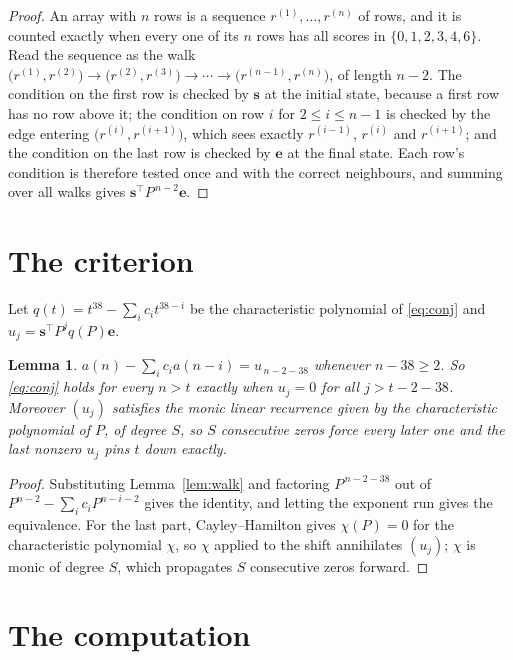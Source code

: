 \documentclass[11pt,a4paper]{article}
\theoremstyle{plain}
\newtheorem{lemma}[theorem]{Lemma}
\theoremstyle{definition}
\begin{document}
\begin{proof}
An array with $n$ rows is a sequence $r^{(1)},\dots,r^{(n)}$ of rows, and it is counted
exactly when every one of its $n$ rows has all scores in $\{0,1,2,3,4,6\}$. Read the sequence as the
walk $\bigl(r^{(1)},r^{(2)}\bigr)\to\bigl(r^{(2)},r^{(3)}\bigr)\to\cdots\to
\bigl(r^{(n-1)},r^{(n)}\bigr)$, of length $n-2$. The condition on the first row is
checked by $\mathbf{s}$ at the initial state, because a first row has no row above it; the
condition on row $i$ for $2\le i\le n-1$ is checked by the edge entering
$\bigl(r^{(i)},r^{(i+1)}\bigr)$, which sees exactly $r^{(i-1)}$, $r^{(i)}$ and
$r^{(i+1)}$; and the condition on the last row is checked by $\mathbf{e}$ at the final
state. Each row's condition is therefore tested once and with the correct neighbours, and
summing over all walks gives $\mathbf{s}^{\!\top}P^{\,n-2}\mathbf{e}$.
\end{proof}

\section{The criterion}

Let $q(t)=t^{38}-\sum_i c_i t^{38-i}$ be the characteristic polynomial of
\eqref{eq:conj} and $u_j=\mathbf{s}^{\!\top}P^{j}q(P)\mathbf{e}$.

\begin{lemma}\label{lem:crit}
$a(n)-\sum_i c_i a(n-i)=u_{\,n-2-38}$ whenever $n-38\ge2$. So \eqref{eq:conj}
holds for every $n>t$ exactly when $u_j=0$ for all $j>t-2-38$. Moreover $(u_j)$
satisfies the monic linear recurrence given by the characteristic polynomial of $P$, of
degree $S$, so $S$ consecutive zeros force every later one and the last nonzero $u_j$ pins
$t$ down exactly.
\end{lemma}

\begin{proof}
Substituting Lemma~\ref{lem:walk} and factoring $P^{\,n-2-38}$ out of
$P^{n-2}-\sum_i c_i P^{n-i-2}$ gives the identity, and letting the exponent run gives the
equivalence. For the last part, Cayley--Hamilton gives $\chi(P)=0$ for the characteristic
polynomial $\chi$, so $\chi$ applied to the shift annihilates $(u_j)$; $\chi$ is monic of
degree $S$, which propagates $S$ consecutive zeros forward.
\end{proof}

\section{The computation}
\end{document}

